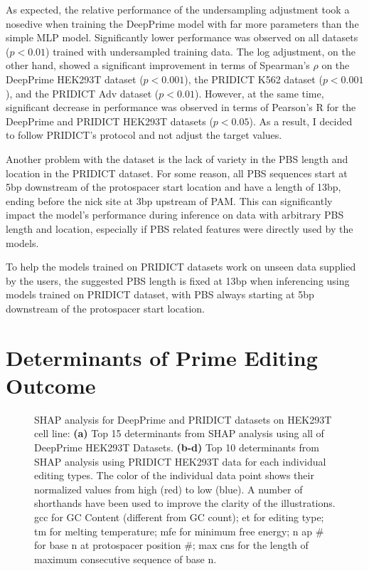 As expected, the relative performance of the undersampling adjustment took a nosedive when training the DeepPrime model with far more parameters than the simple MLP model. Significantly lower performance was observed on all datasets ($p<0.01$) trained with undersampled training data. The log adjustment, on the other hand, showed a significant improvement in terms of Spearman's $\rho$ on the DeepPrime HEK293T dataset ($p<0.001$), the PRIDICT K562 dataset ($p<0.001$), and the PRIDICT Adv dataset ($p<0.01$). However, at the same time, significant decrease in performance was observed in terms of Pearson's R for the DeepPrime and PRIDICT HEK293T datasets ($p<0.05$). As a result, I decided to follow PRIDICT's protocol and not adjust the target values. 

Another problem with the dataset is the lack of variety in the PBS length and location in the PRIDICT dataset. For some reason, all PBS sequences start at 5bp downstream of the protospacer start location and have a length of 13bp, ending before the nick site at 3bp upstream of PAM. This can significantly impact the model's performance during inference on data with arbitrary PBS length and location, especially if PBS related features were directly used by the models. 

To help the models trained on PRIDICT datasets work on unseen data supplied by the users, the suggested PBS length is fixed at 13bp when inferencing using models trained on PRIDICT dataset, with PBS always starting at 5bp downstream of the protospacer start location.



\section{Determinants of Prime Editing Outcome}
\label{sec:determinants}

\begin{figure}
    \caption[SHAP analysis for DeepPrime and PRIDICT datasets]{SHAP analysis for DeepPrime and PRIDICT datasets on HEK293T cell line: \textbf{(a)} Top 15 determinants from SHAP analysis using all of DeepPrime HEK293T Datasets. \textbf{(b-d)} Top 10 determinants from SHAP analysis using PRIDICT HEK293T data for each individual editing types. The color of the individual data point shows their normalized values from high (red) to low (blue). A number of shorthands have been used to improve the clarity of the illustrations. gcc for GC Content (different from GC count); et for editing type; tm for melting temperature; mfe for minimum free energy; n ap \# for base n at protospacer position \#; max cns for the length of maximum consecutive sequence of base n.} 
    \label{fig:shap}
\end{figure}

